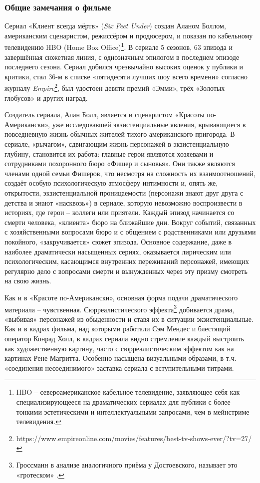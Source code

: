 \subsubsection{Общие замечания о фильме}\label{ux43eux431ux449ux438ux435-ux437ux430ux43cux435ux447ux430ux43dux438ux44f-ux43e-ux444ux438ux43bux44cux43cux435-4}

Сериал «Клиент всегда мёртв» (\emph{Six Feet Under}) создан Аланом Боллом, американским сценаристом, режиссёром и продюсером, и показан по кабельному телевидению HBO (Home Box Office)\footnote{HBO -- североамериканское кабельное телевидение, заявляющее себя как специализирующееся на драматических сериалах для публики с более тонкими эстетическими и интеллектуальными запросами, чем в мейнстриме телевидения.}.
В сериале 5 сезонов, 63 эпизода и завершённая сюжетная линия, с однозначным эпилогом в последнем эпизоде последнего сезона.
Сериал добился чрезвычайно высоких оценок у публики и критики, стал 36-м в списке «пятидесяти лучших шоу всего времени» согласно журналу \emph{Empire}\footnote{https://www.empireonline.com/movies/features/best-tv-shows-ever/?tv=27/}, был удостоен девяти премий «Эмми», трёх «Золотых глобусов» и других наград.

Создатель сериала, Алан Болл, является и сценаристом «Красоты по-Американски», уже исследовавшей экзистенциальные явления, врывающиеся в повседневную жизнь обычных жителей тихого американского пригорода.
В сериале, «рычагом», сдвигающим жизнь персонажей в экзистенциальную глубину, становится их работа: главные герои являются хозяевами и сотрудниками похоронного бюро «Фишер и сыновья».
Они также являются членами одной семьи Фишеров, что несмотря на сложность их взаимоотношений, создаёт особую психологическую атмосферу интимности и, опять же, открытости, экзистенциальной проницаемости (персонажи знают друг друга с детства и знают «насквозь») в сериале, которую невозможно воспроизвести в историях, где герои -- коллеги или приятели.
Каждый эпизод начинается со смерти человека, «клиента» бюро на ближайшие дни.
Вокруг событий, связанных с хозяйственными вопросами бюро и с общением с родственниками или друзьями покойного, «закручивается» сюжет эпизода.
Основное содержание, даже в наиболее драматически насыщенных сериях, оказывается лирическим или психологическим, касающимся внутренних переживаний персонажей, имеющих регулярно дело с вопросами смерти и вынужденных через эту призму смотреть на свою жизнь.

Как и в «Красоте по-Американски», основная форма подачи драматического материала -- чувственная.
Сюрреалистического эффекта\footnote{Гроссманн в анализе аналогичного приёма у Достоевского, называет это «гротеском» \autocite{grossman.dostoevskiy.1925}.} добивается драма, «выбивая» персонажей из обыденности и ставя их в ситуации экзистенциальные.
Как и в кадрах фильма, над которыми работали Сэм Мендес и блестящий оператор Конрад Холл, в кадрах сериала видно стремление каждый выстроить как художественную картину, часто с сюрреалистическим эффектом как на картинах Рене Магритта.
Особенно насыщена визуальными образами, в т.ч. «соединения несоединимого» заставка сериала с вступительными титрами.

